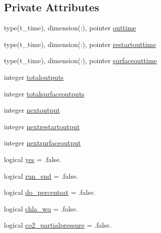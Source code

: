 \subsection*{Private Attributes}
\begin{DoxyCompactItemize}
\item 
type(t\+\_\+time), dimension(\+:), pointer \mbox{\hyperlink{structmodulewaterproperties_1_1t__output_a9700857c032232b930c1f2dd1ed9709d}{outtime}}
\item 
type(t\+\_\+time), dimension(\+:), pointer \mbox{\hyperlink{structmodulewaterproperties_1_1t__output_ad62702c17ace9d03b535c9490a8ab566}{restartouttime}}
\item 
type(t\+\_\+time), dimension(\+:), pointer \mbox{\hyperlink{structmodulewaterproperties_1_1t__output_a96d3f2335353edc1e51557b68384cb63}{surfaceouttime}}
\item 
integer \mbox{\hyperlink{structmodulewaterproperties_1_1t__output_ab4a0d470a3f423a2dfa2415718cce637}{totaloutputs}}
\item 
integer \mbox{\hyperlink{structmodulewaterproperties_1_1t__output_a5bbf717af0b5b2e36fcec331d938608f}{totalsurfaceoutputs}}
\item 
integer \mbox{\hyperlink{structmodulewaterproperties_1_1t__output_acc73f55174d48c4114e583e9396bb86b}{nextoutput}}
\item 
integer \mbox{\hyperlink{structmodulewaterproperties_1_1t__output_ae542ba63752bd43e5c7bb9b0ebd3a91d}{nextrestartoutput}}
\item 
integer \mbox{\hyperlink{structmodulewaterproperties_1_1t__output_a461074f5a5a205e2fc64b06712068a6a}{nextsurfaceoutput}}
\item 
logical \mbox{\hyperlink{structmodulewaterproperties_1_1t__output_a5ab9fada26018b4e60ab9c15725b64e5}{yes}} = .false.
\item 
logical \mbox{\hyperlink{structmodulewaterproperties_1_1t__output_a9af5f4ee7a6abe6b97371af1c2a3a60b}{run\+\_\+end}} = .false.
\item 
logical \mbox{\hyperlink{structmodulewaterproperties_1_1t__output_a892c9f4bc918e94bf5aadcecadd2e5aa}{do\+\_\+percentsat}} = .false.
\item 
logical \mbox{\hyperlink{structmodulewaterproperties_1_1t__output_a5a870598511cb8eceaae7658369279bc}{chla\+\_\+wq}} = .false.
\item 
logical \mbox{\hyperlink{structmodulewaterproperties_1_1t__output_adb90363be2696f47da51fecfcee37518}{co2\+\_\+partialpressure}} = .false.
\item 

\end{DoxyCompactItemize}
